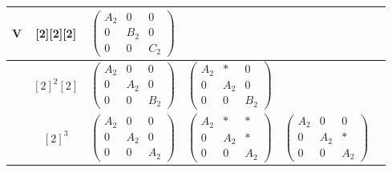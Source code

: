 \documentclass[11pt,a4paper]{article}
\theoremstyle{plain}
\theoremstyle{definition}
\theoremstyle{remark}
\begin{document}
\begin{center}
\begin{tabular}{|c|c|cccc|}
V & [2][2][2]&
$\begin{pmatrix}
A_2 & 0 & 0 \\
0   & B_2 & 0 \\
0   & 0   & C_2
\end{pmatrix}$ &
 & &
\\ \hline
 &  $[2]^2[2]$ &
$\begin{pmatrix}
A_2 & 0 & 0 \\
0   & A_2 & 0 \\
0   & 0   & B_2
\end{pmatrix}$ &
$\begin{pmatrix}
A_2 & * & 0 \\
0   & A_2 & 0 \\
0   & 0   & B_2
\end{pmatrix}$ &&
 \\ \hline
&  $[2]^3$ &
$\begin{pmatrix}
A_2 & 0 & 0 \\
0   & A_2 & 0 \\
0   & 0   & A_2
\end{pmatrix}$ &
$\begin{pmatrix}
A_2 & * & * \\
0   & A_2 & * \\
0   & 0   & A_2
\end{pmatrix}$ &
$\begin{pmatrix}
A_2 & 0 & 0 \\
0   & A_2 & * \\
0   & 0   & A_2
\end{pmatrix}$ &\\ \hline


\end{tabular}
\end{center}
\end{document}
